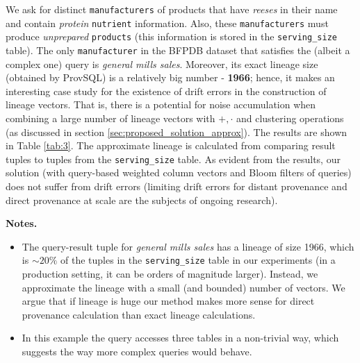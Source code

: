 \begin{example-withrun}\label{experiment:3}
% 
We ask for distinct \texttt{manufacturers} of products that have \textit{reeses} in their name and contain \textit{protein}
                         \texttt{nutrient} information.
                Also, these \texttt{manufacturers} must produce \textit{unprepared} \texttt{products} (this information is stored in the \texttt{serving\_size} table).
The only \texttt{manufacturer} in the BFPDB dataset that satisfies the (albeit a complex one) query is \textit{general mills sales}. Moreover, its exact lineage size (obtained by ProvSQL) is a relatively big number - \textbf{1966}; hence, it makes an interesting case study for the existence of drift errors in the construction of lineage vectors. That is, there is a potential for noise accumulation when combining a large number of lineage vectors with $+,\cdot$ and clustering operations (as discussed in section \ref{sec:proposed_solution_approx}). 
The results are shown in Table \ref{tab:3}. The approximate lineage is calculated from comparing result tuples to tuples from the \texttt{serving\_size} table. As evident from the results, our solution (with query-based weighted column vectors and Bloom filters of queries) does not suffer from drift errors (limiting drift errors for distant provenance and direct provenance at scale are the subjects of ongoing research).
\par\textbf{Notes.} 
\begin{itemize}
    \item The query-result tuple for \textit{general mills sales} has a lineage of size 1966, which is ${\sim}20\%$ of the tuples in the \texttt{serving\_size} table in our experiments (in a production setting, it can be orders of magnitude larger). Instead, we approximate the lineage with a small (and bounded) number of vectors. We argue that if lineage is huge our method makes more sense for direct provenance calculation than exact lineage calculations.
    \item In this example the query accesses three tables in a non-trivial way, which suggests the way more complex queries would behave.
\end{itemize}

\end{example-withrun}



